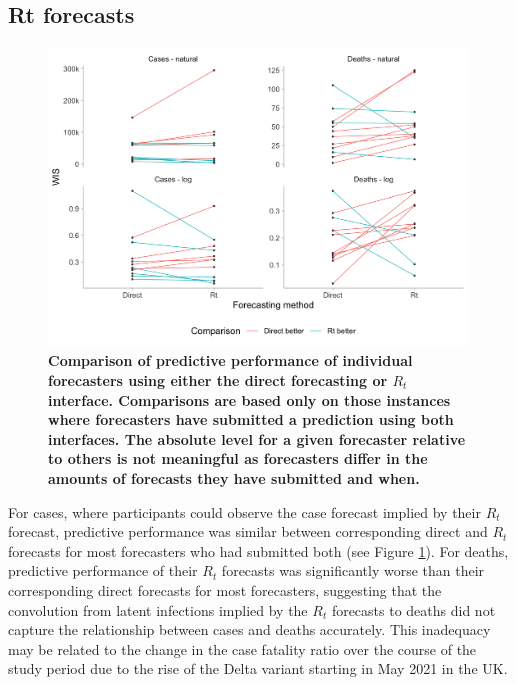 \documentclass[10pt,a4paper,twocolumn]{article}
\begin{document}
\subsection*{Rt forecasts}

\begin{figure}
\centering
\includegraphics[width=0.99\textwidth]{../output/figures/comparison-direct-rt-individual.png}
\caption{\bf{Comparison of predictive performance of individual forecasters using either the direct forecasting or $R_t$ interface}. Comparisons are based only on those instances where forecasters have submitted a prediction using both interfaces. The absolute level for a given forecaster relative to others is not meaningful as forecasters differ in the amounts of forecasts they have submitted and when.}
\label{fig:comparison-direct-rt-individual}
\end{figure}

For cases, where participants could observe the case forecast implied by their $R_t$ forecast, predictive performance was similar between corresponding direct and $R_t$ forecasts for most forecasters who had submitted both (see Figure \ref{fig:comparison-direct-rt-individual}). For deaths, predictive performance of their $R_t$ forecasts was significantly worse than their corresponding direct forecasts for most forecasters, suggesting that the convolution from latent infections implied by the $R_t$ forecasts to deaths did not capture the relationship between cases and deaths accurately. This inadequacy may be related to the change in the case fatality ratio over the course of the study period due to the rise of the Delta variant starting in May 2021 in the UK.  
\end{document}
